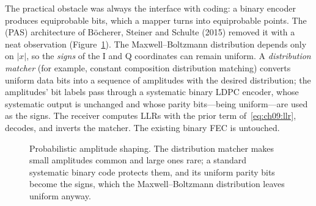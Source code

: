 The practical obstacle was always the interface with coding: a binary encoder produces
equiprobable bits, which a mapper turns into equiprobable points. The  (PAS) architecture of B\"ocherer, Steiner and Schulte (2015) removed it with a neat
observation (Figure~\ref{fig:ch09_pas}). The Maxwell--Boltzmann distribution depends only on $|x|$,
so the \emph{signs} of the I and Q coordinates can remain uniform. A \emph{distribution matcher}
(for example, constant composition distribution matching) converts uniform data bits into a
sequence of amplitudes with the desired distribution; the amplitudes' bit labels pass through a
systematic binary LDPC encoder, whose systematic output is unchanged and whose parity
bits---being uniform---are used as the signs. The receiver computes LLRs with the prior term
of~\eqref{eq:ch09:llr}, decodes, and inverts the matcher. The existing binary FEC is untouched.

\begin{figure}[htbp]
\centering
{}
\caption{Probabilistic amplitude shaping. The distribution matcher makes small amplitudes
common and large ones rare; a standard systematic binary code protects them, and its uniform
parity bits become the signs, which the Maxwell--Boltzmann distribution leaves uniform anyway.}
\label{fig:ch09_pas}
\end{figure}

